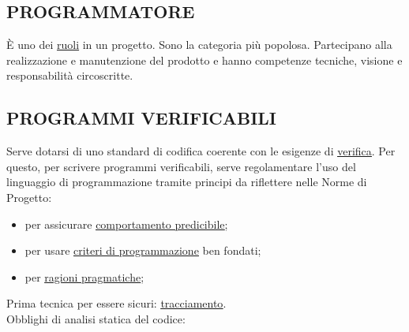 		\subsection{PROGRAMMATORE}  \label{programmatore}
		È uno dei \underline{\hyperref[ruoli]{ruoli}} in un progetto. Sono la categoria più popolosa. Partecipano alla realizzazione e manutenzione del prodotto e hanno competenze tecniche, visione e responsabilità circoscritte.
		
		
		\subsection{PROGRAMMI VERIFICABILI}		\label{programmiverificabili} %
		Serve dotarsi di uno standard di codifica coerente con le esigenze di \underline{\hyperref[verificare]{verifica}}. Per questo, per scrivere programmi verificabili, serve regolamentare l’uso del linguaggio di programmazione tramite principi da riflettere nelle Norme di Progetto:
		\begin{itemize}
			\item per assicurare \underline{\hyperref[comportamentopredicibile]{comportamento predicibile}};
			\item per usare \underline{\hyperref[criteriprog]{criteri di programmazione}} ben fondati;
			\item per \underline{\hyperref[pragmatico]{ragioni pragmatiche}};
		\end{itemize}
		Prima tecnica per essere sicuri: \underline{\hyperref[tracciamento]{tracciamento}}. \\
		Obblighi di analisi statica del codice: %
